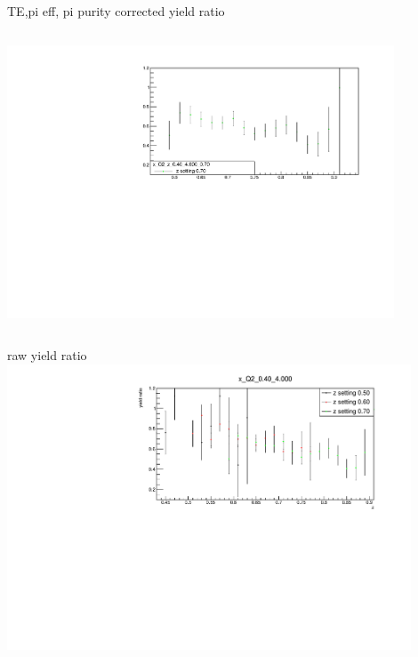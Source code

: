 \begin{frame}{TE,pi eff, pi purity corrected yield ratio}
\begin{columns}
\begin{column}[T]{0.5\textwidth}
\includegraphics[width = 0.9\textwidth]{results/yield/statistics_corr/x_Q2_z_0.40_4.000_0.70_ratio.pdf}
\end{column}
\begin{column}[T]{0.5\textwidth}
\end{column}
\end{columns}
\end{frame}
\begin{frame}{raw yield ratio}
\includegraphics[width = 0.9\textwidth]{results/yield/statistics/x_Q2_0.40_4.000_ratio.pdf}
\end{frame}
